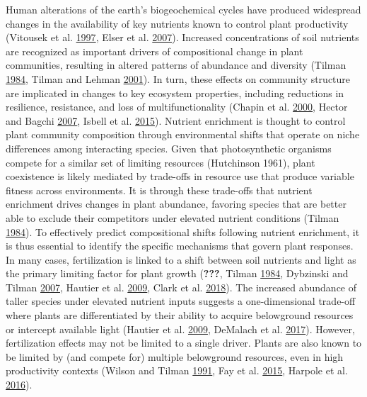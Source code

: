 \documentclass[twoside,12pt,final]{ucthesis-CA2012}
\begin{document}
\begin{ucmainmatter}
Human alterations of the earth's biogeochemical cycles have produced widespread changes in the availability of key nutrients known to control plant productivity (Vitousek et al. \protect\hyperlink{ref-Vitousek1997b}{1997}, Elser et al. \protect\hyperlink{ref-Elser2007}{2007}).
Increased concentrations of soil nutrients are recognized as important drivers of compositional change in plant communities, resulting in altered patterns of abundance and diversity (Tilman \protect\hyperlink{ref-Tilman1984}{1984}, Tilman and Lehman \protect\hyperlink{ref-Tilman2001}{2001}).
In turn, these effects on community structure are implicated in changes to key ecosystem properties, including reductions in resilience, resistance, and loss of multifunctionality (Chapin et al. \protect\hyperlink{ref-Chapin2000}{2000}, Hector and Bagchi \protect\hyperlink{ref-Hector2007}{2007}, Isbell et al. \protect\hyperlink{ref-Isbell2015}{2015}).
Nutrient enrichment is thought to control plant community composition through environmental shifts that operate on niche differences among interacting species. Given that photosynthetic organisms compete for a similar set of limiting resources (Hutchinson 1961), plant coexistence is likely mediated by trade-offs in resource use that produce variable fitness across environments. It is through these trade-offs that nutrient enrichment drives changes in plant abundance, favoring species that are better able to exclude their competitors under elevated nutrient conditions (Tilman \protect\hyperlink{ref-Tilman1984}{1984}).
To effectively predict compositional shifts following nutrient enrichment, it is thus essential to identify the specific mechanisms that govern plant responses. In many cases, fertilization is linked to a shift between soil nutrients and light as the primary limiting factor for plant growth ({\textbf{???}}, Tilman \protect\hyperlink{ref-Tilman1984}{1984}, Dybzinski and Tilman \protect\hyperlink{ref-Dybzinski2007a}{2007}, Hautier et al. \protect\hyperlink{ref-Hautier2009}{2009}, Clark et al. \protect\hyperlink{ref-Clark2018}{2018}).
The increased abundance of taller species under elevated nutrient inputs suggests a one-dimensional trade-off where plants are differentiated by their ability to acquire belowground resources or intercept available light (Hautier et al. \protect\hyperlink{ref-Hautier2009}{2009}, DeMalach et al. \protect\hyperlink{ref-DeMalach2017a}{2017}).
However, fertilization effects may not be limited to a single driver. Plants are also known to be limited by (and compete for) multiple belowground resources, even in high productivity contexts (Wilson and Tilman \protect\hyperlink{ref-Wilson1991}{1991}, Fay et al. \protect\hyperlink{ref-Fay2015}{2015}, Harpole et al. \protect\hyperlink{ref-Harpole2016}{2016}).

\end{ucmainmatter}
\end{document}
